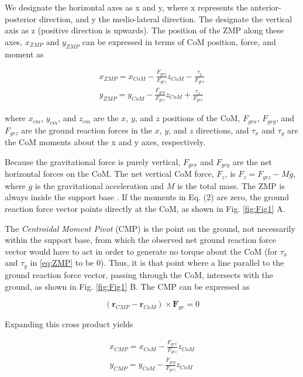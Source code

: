 \documentclass{llncs}
\begin{document}
We designate the horizontal axes as x and y, where x represents the anterior-posterior direction, and y the medio-lateral direction.
The designate the vertical axis as z (positive direction is upwards).
The position of the ZMP along these axes, $x_{ZMP}$ and $y_{ZMP}$ can be expressed in terms of CoM position, force, and moment as

\begin{eqnarray}
x_{ZMP} = x_{CoM} - \frac{F_{grx}}{F_{grz}} z_{CoM} - \frac{\tau_y}{F_{grz}}\\
y_{ZMP} = y_{CoM} - \frac{F_{gry}}{F_{grz}} z_{CoM} + \frac{\tau_x}{F_{grz}}
\label{eq:ZMP}
\end{eqnarray}

\noindent where $x_{cm}$, $y_{cm}$, and $z_{cm}$ are the $x$, $y$, and $z$ positions of the CoM, $F_{grx}$, $F_{gry}$, and $F_{grz}$ are the ground 
reaction forces in the $x$, $y$, and $z$ directions, and $\tau_x$ and $\tau_y$ are the CoM moments about the x and y axes, respectively.

Because the gravitational force is purely vertical, $F_{grx}$ and $F_{gry}$ are the net horizontal forces on the CoM.  The net vertical CoM force, $F_z$,
is $F_z = F_{grz} - Mg$, where $g$ is the gravitational acceleration and $M$ is the total mass.
The ZMP is always inside the support base \cite{popovic2005ground}.  If the moments in Eq. (2) are zero, the ground reaction force vector points directly at the CoM, as shown in Fig. \ref{fig:Fig1} A.

The \textit{Centroidal Moment Pivot} (CMP) is the point on the ground, not necessarily within the support base, from  which the observed net ground reaction 
force vector would have to act in order to generate no torque about the CoM (for $\tau_x$ and $\tau_y$ in \ref{eq:ZMP} to be 0).
Thus, it is that point where a line parallel to the ground reaction force vector, passing through the CoM, intersects with the ground, 
as shown in Fig. \ref{fig:Fig1} B.  
The CMP can be expressed as

\begin{equation}
\left( \mathbf{r}_{CMP} - \mathbf{r}_{CoM} \right) \times \mathbf{F}_{gr} = 0
\label{eq:CMP}
\end{equation}

Expanding this cross product yields

\begin{eqnarray}
x_{CMP} = x_{CoM} - \frac{F_{grx}}{F_{grz}} z_{CoM}\\
y_{CMP} = y_{CoM} - \frac{F_{gry}}{F_{grz}} z_{CoM}
\label{eq:CMP2}
\end{eqnarray}
\end{document}
